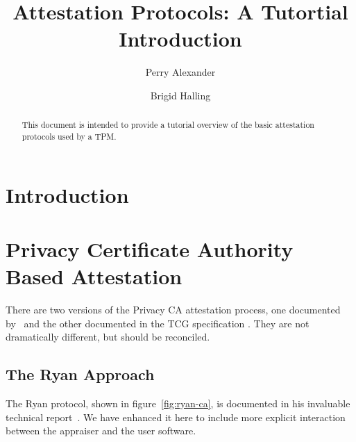 \documentclass[10pt]{article}
\title{Attestation Protocols: A Tutortial Introduction}
\author{Perry Alexander \and Brigid Halling}
\begin{document}
\maketitle
\tableofcontents
\listoffigures
\listoftables

\begin{abstract}
  This document is intended to provide a tutorial overview of the
  basic attestation protocols used by a TPM.
\end{abstract}

\section{Introduction}

\section{Privacy Certificate Authority Based Attestation}

There are two versions of the Privacy CA attestation process, one
documented by~\citet{Ryan:09:Introduction-to} and the other documented
in the TCG specification \citep{---::TCG-TPM-Specifi}.  They are not
dramatically different, but should be reconciled.

\subsection{The Ryan Approach}

The Ryan protocol, shown in figure~\ref{fig:ryan-ca}, is documented in
his invaluable technical report~\cite{Ryan:09:Introduction-to}.  We
have enhanced it here to include more explicit interaction between the
appraiser and the user software.  
\end{document}
